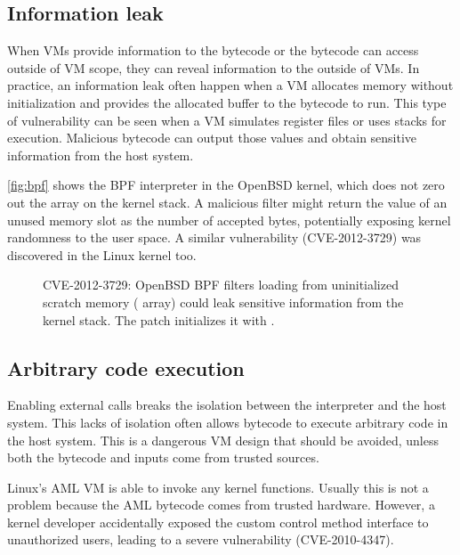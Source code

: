 
\subsection{Information leak}
\label{s:vuln:leak}

When VMs provide information to the bytecode or the bytecode can access outside
of VM scope, they can reveal information to the outside of VMs. In practice, an
information leak often happen when a VM allocates memory without initialization
and provides the allocated buffer to the bytecode to run. This type of
vulnerability can be seen when a VM simulates register files or uses stacks for
execution. Malicious bytecode can output those values and obtain sensitive
information from the host system.
 
\autoref{fig:bpf} shows the BPF interpreter in the OpenBSD kernel, which does
not zero out the  array on the kernel stack. A malicious filter might
return the value of an unused memory slot as the number of accepted bytes,
potentially exposing kernel randomness to the user space.  A similar
vulnerability (CVE-2012-3729) was discovered in the Linux kernel too.

\begin{figure}
\centering

\coderule
\caption{
CVE-2012-3729:
OpenBSD BPF filters loading from uninitialized scratch memory 
( array) could leak sensitive information from the kernel stack.
The patch initializes it with . }
\label{fig:bpf}
\end{figure}

\subsection{Arbitrary code execution}
\label{s:vuln:exec}

Enabling external calls breaks the isolation between the interpreter and the
host system. This lacks of isolation often allows bytecode to execute arbitrary
code in the host system.  This is a dangerous VM design that should be avoided,
unless both the bytecode and inputs come from trusted sources.

Linux's AML VM is able to invoke any kernel functions. Usually this is not a
problem because the AML bytecode comes from trusted hardware. However, a kernel
developer accidentally exposed the custom control method interface to
unauthorized users, leading to a severe vulnerability (CVE-2010-4347).

